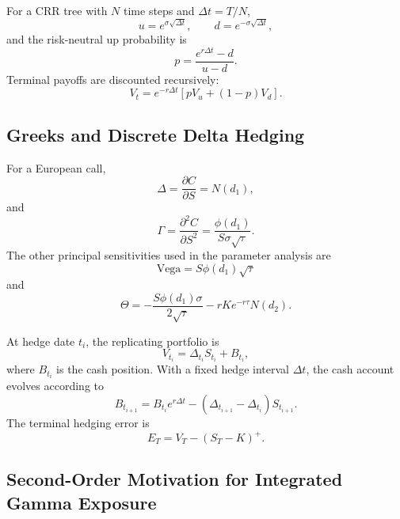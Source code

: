 \documentclass[11pt,a4paper]{article}
\begin{document}
For a CRR tree with $N$ time steps and $\Delta t=T/N$,
\begin{equation}
    u=e^{\sigma\sqrt{\Delta t}},\qquad d=e^{-\sigma\sqrt{\Delta t}},
\end{equation}
and the risk-neutral up probability is
\begin{equation}
    p=\frac{e^{r\Delta t}-d}{u-d}.
\end{equation}
Terminal payoffs are discounted recursively:
\begin{equation}
    V_t=e^{-r\Delta t}\left[pV_u+(1-p)V_d\right].
\end{equation}

\subsection{Greeks and Discrete Delta Hedging}

For a European call,
\begin{equation}
    \Delta=\frac{\partial C}{\partial S}=N(d_1),
\end{equation}
and
\begin{equation}
    \Gamma=\frac{\partial^2C}{\partial S^2}
    =\frac{\phi(d_1)}{S\sigma\sqrt{\tau}}.
\end{equation}
The other principal sensitivities used in the parameter analysis are
\begin{equation}
    \text{Vega}=S\phi(d_1)\sqrt{\tau}
\end{equation}
and
\begin{equation}
    \Theta=-\frac{S\phi(d_1)\sigma}{2\sqrt{\tau}}
    -rKe^{-r\tau}N(d_2).
\end{equation}

At hedge date $t_i$, the replicating portfolio is
\begin{equation}
    V_{t_i}=\Delta_{t_i}S_{t_i}+B_{t_i},
\end{equation}
where $B_{t_i}$ is the cash position. With a fixed hedge interval $\Delta t$, the cash account evolves according to
\begin{equation}
    B_{t_{i+1}}=B_{t_i}e^{r\Delta t}
    -(\Delta_{t_{i+1}}-\Delta_{t_i})S_{t_{i+1}}.
\end{equation}
The terminal hedging error is
\begin{equation}
    E_T=V_T-(S_T-K)^+.
\end{equation}

\subsection{Second-Order Motivation for Integrated Gamma Exposure}
\label{sec:gamma_motivation}
\end{document}
